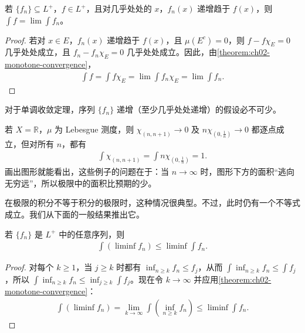 \documentclass[../../main.tex]{subfiles}%
\begin{document}
\begin{corollary}\label{corollary:ch02-monotone-convergence-ae}
若 $\{f_n\}\subseteq L^+$，$f\in L^+$，且对几乎处处的 $x$，$f_n(x)$ 递增趋于 $f(x)$，则 $\int f=\lim\int f_n$。
\end{corollary}
\begin{proof}
若对 $x\in E$，$f_n(x)$ 递增趋于 $f(x)$，且 $\mu(E^c)=0$，则 $f-f\chi_E=0$ 几乎处处成立，且 $f_n-f_n\chi_E=0$ 几乎处处成立。因此，由\cref{theorem:ch02-monotone-convergence}，
\begin{align*}
\int f=\int f\chi_E=\lim\int f_n\chi_E=\lim\int f_n.
\end{align*}
\end{proof}
对于单调收敛定理，序列 $\{f_n\}$ 递增（至少几乎处处递增）的假设必不可少。
\begin{example}\label{example:ch02-escaping-mass}
若 $X=\mathbb{R}$，$\mu$ 为 Lebesgue 测度，则 $\chi_{(n,n+1)}\to0$ 及 $n\chi_{(0,\frac1n)}\to0$ 都逐点成立，但对所有 $n$，都有
\begin{align*}
\int\chi_{(n,n+1)}=\int n\chi_{(0,\frac1n)}=1.
\end{align*}
画出图形就能看出，这些例子的问题在于：当 $n\to\infty$ 时，图形下方的面积“逃向无穷远”，所以极限中的面积比预期的少。
\end{example}
在极限的积分不等于积分的极限时，这种情况很典型。不过，此时仍有一个不等式成立。我们从下面的一般结果推出它。
\begin{lemma}[Fatou 引理]\label{lemma:ch02-fatou}
若 $\{f_n\}$ 是 $L^+$ 中的任意序列，则
\begin{align*}
\int(\liminf f_n)\le\liminf\int f_n.
\end{align*}
\end{lemma}
\begin{proof}
对每个 $k\ge1$，当 $j\ge k$ 时都有 $\inf_{n\ge k}f_n\le f_j$，从而 $\int\inf_{n\ge k}f_n\le\int f_j$，所以 $\int\inf_{n\ge k}f_n\le\inf_{j\ge k}\int f_j$。现在令 $k\to\infty$ 并应用\cref{theorem:ch02-monotone-convergence}：
\begin{align*}
\int(\liminf f_n)=\lim_{k\to\infty}\int\left(\inf_{n\ge k}f_n\right)\le\liminf\int f_n.
\end{align*}
\end{proof}
\end{document}

